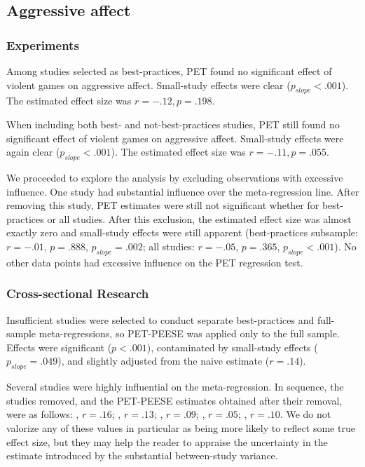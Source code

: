 \documentclass[man]{apa6}
\begin{document}
\subsection{Aggressive affect}
\subsubsection{Experiments}
Among studies selected as best-practices, PET found no significant effect of violent games on aggressive affect. Small-study effects were clear ($p_{slope} <.001$). The estimated effect size was $r = -.12, p = .198$.

When including both best- and not-best-practices studies, PET still found no significant effect of violent games on aggressive affect. Small-study effects were again clear ($p_{slope} < .001$). The estimated effect size was $r = -.11, p = .055$.

We proceeded to explore the analysis by excluding observations with excessive influence. One study \citep{Ballard:Weist:1996} had substantial influence over the meta-regression line. After removing this study, PET estimates were still not significant whether for best-practices or all studies. After this exclusion, the estimated effect size was almost exactly zero and small-study effects were still apparent (best-practices subsample: $r = -.01$, $p = .888$, $p_{slope} = .002$; all studies: $r = -.05$, $p = .365$, $p_{slope} < .001$). No other data points had excessive influence on the PET regression test. 

\subsubsection{Cross-sectional Research}
Insufficient studies were selected to conduct separate best-practices and full-sample meta-regressions, so PET-PEESE was applied only to the full sample. Effects were significant ($p < .001$), contaminated by small-study effects ($p_{slope} = .049$), and slightly adjusted from the naive estimate ($r = .14$).

Several studies were highly influential on the meta-regression. In sequence, the studies removed, and the PET-PEESE estimates obtained after their removal, were as follows:  \citet{Urashima:Suzuki:2003}, $r = .16$; \citet{Uozumi:2006}, $r = .13$; \citet[study 2]{Matsuzaki:etal:2004}, $r = .09$;  \citet{Yukawa:Sakamoto:2001}, $r = .05$;  \citet{NationalAssemblyForYouthDevelopment:2006}, $r = .10$. We do not valorize any of these values in particular as being more likely to reflect some true effect size, but they may help the reader to appraise the uncertainty in the estimate introduced by the substantial between-study variance.
\end{document}
